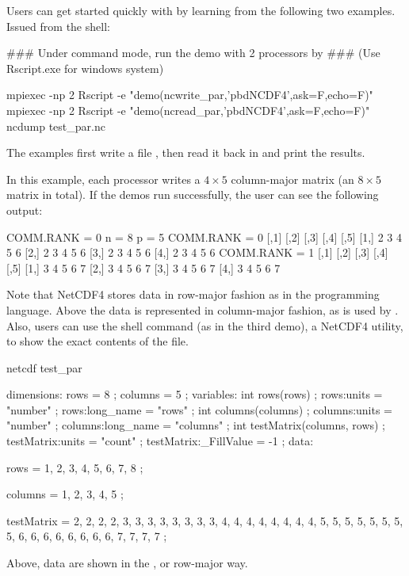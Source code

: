 Users can get started quickly with  by learning from the following two examples.  Issued from the shell:
\begin{Command}
### Under command mode, run the demo with 2 processors by
### (Use Rscript.exe for windows system)

mpiexec -np 2 Rscript -e "demo(ncwrite_par,'pbdNCDF4',ask=F,echo=F)"
mpiexec -np 2 Rscript -e "demo(ncread_par,'pbdNCDF4',ask=F,echo=F)"
ncdump test_par.nc
\end{Command}
The examples first write a file , then read it back in and print the results.

In this example, each processor writes a $4\times 5$ column-major matrix (an $8\times 5$ matrix in total).  If the demos run successfully, the user can see the following output:
\begin{CodeOutput}[title=Output of \code{ncread}]
COMM.RANK = 0
n = 8 p = 5
COMM.RANK = 0
     [,1] [,2] [,3] [,4] [,5]
[1,]    2    3    4    5    6
[2,]    2    3    4    5    6
[3,]    2    3    4    5    6
[4,]    2    3    4    5    6
COMM.RANK = 1
     [,1] [,2] [,3] [,4] [,5]
[1,]    3    4    5    6    7
[2,]    3    4    5    6    7
[3,]    3    4    5    6    7
[4,]    3    4    5    6    7
\end{CodeOutput}

Note that NetCDF4 stores data in row-major fashion as in the  programming language.  Above the data is represented in column-major fashion, as is used by . Also, users can use the shell command  (as in the third demo), a NetCDF4 utility, to show the exact contents of the  file.
\begin{CodeOutput}[title=Output of \code{ncdump}]
netcdf test_par {
dimensions:
	rows = 8 ;
	columns = 5 ;
variables:
	int rows(rows) ;
		rows:units = "number" ;
		rows:long_name = "rows" ;
	int columns(columns) ;
		columns:units = "number" ;
		columns:long_name = "columns" ;
	int testMatrix(columns, rows) ;
		testMatrix:units = "count" ;
		testMatrix:_FillValue = -1 ;
data:

 rows = 1, 2, 3, 4, 5, 6, 7, 8 ;

 columns = 1, 2, 3, 4, 5 ;

 testMatrix =
  2, 2, 2, 2, 3, 3, 3, 3,
  3, 3, 3, 3, 4, 4, 4, 4,
  4, 4, 4, 4, 5, 5, 5, 5,
  5, 5, 5, 5, 6, 6, 6, 6,
  6, 6, 6, 6, 7, 7, 7, 7 ;
}
\end{CodeOutput}
Above, data are shown in the , or row-major way.

